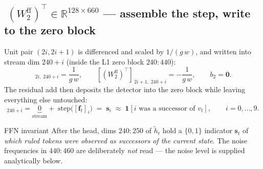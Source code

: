 \documentclass[11pt]{article}
\newcommand{\R}{\mathbb{R}}
\newcommand{\T}{^{\!\top}}
\newcommand{\fvec}{\mathbf{f}}
\newcommand{\one}{\mathbf{1}}
\newcommand{\zeros}{\mathbf{0}}
\begin{document}
\subsection{$\;(W_2^{\mathrm{ff}})\T\in\R^{128\times660}$ --- assemble the step, write to the zero block}
Unit pair $(2i,2i{+}1)$ is differenced and scaled by $1/(g\,w)$, and written into stream dim
$240{+}i$ (inside the L1 zero block $240{:}440$):
\begin{equation}
[(W_2^{\mathrm{ff}})\T]_{\,2i,\;240+i}=\frac{1}{g\,w},\qquad
[(W_2^{\mathrm{ff}})\T]_{\,2i+1,\;240+i}=-\frac{1}{g\,w},\qquad b_2=\zeros .
\end{equation}
The residual add then deposits the detector into the zero block while leaving everything else
untouched:
\begin{equation}
[\tilde h_t]_{240+i}=\underbrace{0}_{\text{stream}}+\;\mathrm{step}\big([\fvec_t]_i\big)
\;=\;\mathbf{s}_i\;\approx\;\one[i\text{ was a successor of }v_t],\qquad i=0,\dots,9.
\end{equation}

\begin{invbox}{FFN invariant}
After the head, dims $240{:}250$ of $\tilde h_t$ hold a $\{0,1\}$ indicator $\mathbf{s}_t$ of
\emph{which ruled tokens were observed as successors of the current state}. The noise frequencies
in $440{:}460$ are deliberately \emph{not} read --- the noise level is supplied analytically below.
\end{invbox}

\end{document}
